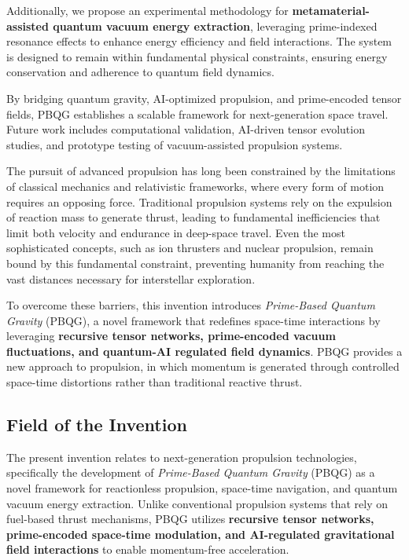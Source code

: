 \documentclass{article}
\theoremstyle{plain}
\begin{document}
Additionally, we propose an experimental methodology for \textbf{metamaterial-assisted quantum vacuum energy extraction}, leveraging prime-indexed resonance effects to enhance energy efficiency and field interactions. The system is designed to remain within fundamental physical constraints, ensuring energy conservation and adherence to quantum field dynamics.

By bridging quantum gravity, AI-optimized propulsion, and prime-encoded tensor fields, PBQG establishes a scalable framework for next-generation space travel. Future work includes computational validation, AI-driven tensor evolution studies, and prototype testing of vacuum-assisted propulsion systems.

The pursuit of advanced propulsion has long been constrained by the limitations of classical mechanics and relativistic frameworks, where every form of motion requires an opposing force. Traditional propulsion systems rely on the expulsion of reaction mass to generate thrust, leading to fundamental inefficiencies that limit both velocity and endurance in deep-space travel. Even the most sophisticated concepts, such as ion thrusters and nuclear propulsion, remain bound by this fundamental constraint, preventing humanity from reaching the vast distances necessary for interstellar exploration.

To overcome these barriers, this invention introduces \textit{Prime-Based Quantum Gravity} (PBQG), a novel framework that redefines space-time interactions by leveraging \textbf{recursive tensor networks, prime-encoded vacuum fluctuations, and quantum-AI regulated field dynamics}. PBQG provides a new approach to propulsion, in which momentum is generated through controlled space-time distortions rather than traditional reactive thrust.

\subsection{Field of the Invention}
\label{subsec:field_of_invention}

The present invention relates to next-generation propulsion technologies, specifically the development of \textit{Prime-Based Quantum Gravity} (PBQG) as a novel framework for reactionless propulsion, space-time navigation, and quantum vacuum energy extraction. Unlike conventional propulsion systems that rely on fuel-based thrust mechanisms, PBQG utilizes \textbf{recursive tensor networks, prime-encoded space-time modulation, and AI-regulated gravitational field interactions} to enable momentum-free acceleration. 
\end{document}

